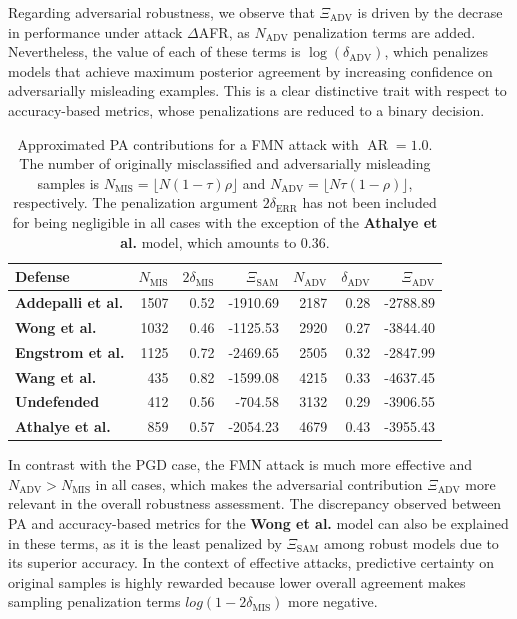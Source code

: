 Regarding adversarial robustness, we observe that $\Xi_{\text{ADV}}$ is driven by the decrase in 
performance under attack $\Delta$AFR, as $N_{\text{ADV}}$ penalization terms
are added. Nevertheless, the value of each of these terms is $\log(\delta_{\text{ADV}})$, which penalizes
models that achieve maximum posterior agreement by increasing confidence on adversarially
misleading examples. This is a clear distinctive trait with respect to accuracy-based metrics,
whose penalizations are reduced to a binary decision.


\begin{table}[H]
    \centering
    \begin{tabular}{l|rrr|rrr}
    Defense & $N_{\text{MIS}}$ & $2 \delta_{\text{MIS}}$ & $\Xi_{\text{SAM}}$ & $N_{\text{ADV}}$ & $\delta_{\text{ADV}}$ & $\Xi_{\text{ADV}}$ \\
    \midrule
    {\color{tab:purple} \textbf{Addepalli et al.}} & 1507 & 0.52 & -1910.69 & 2187 & 0.28 & -2788.89 \\
    {\color{tab:red} \textbf{Wong et al.}} & 1032 & 0.46 & -1125.53 & 2920 & 0.27 & -3844.40 \\
    {\color{tab:blue} \textbf{Engstrom et al.}} & 1125 & 0.72 & -2469.65 & 2505 & 0.32 & -2847.99 \\
    {\color{tab:brown} \textbf{Wang et al.}} & 435 & 0.82 & -1599.08 & 4215 & 0.33 & -4637.45 \\
    {\color{tab:orange} \textbf{Undefended}} & 412 & 0.56 & -704.58 & 3132 & 0.29 & -3906.55 \\
    {\color{tab:green} \textbf{Athalye et al.}} & 859 & 0.57 & -2054.23 & 4679 & 0.43 & -3955.43 \\
    \bottomrule
    \end{tabular}
    \caption{
    Approximated PA contributions for a FMN attack with $\operatorname{AR} = 1.0$. The number of 
    originally misclassified and adversarially misleading
    samples is $N_{\text{MIS}} = \lfloor N (1-\tau) \rho \rfloor$ and
    $N_{\text{ADV}} = \lfloor N \tau (1-\rho) \rfloor$, respectively. 
    The penalization argument $2 \delta_{\text{ERR}}$ has not
    been included for being negligible in all cases with the exception of the 
    {\color{tab:green} \textbf{Athalye et al.}} model, which amounts to 0.36. 
    }
    \label{tab:approx_pa_fmn_table}
    \end{table}

In contrast with the PGD case, the FMN attack is much more effective and $N_{\text{ADV}} > N_{\text{MIS}}$
in all cases, which makes the adversarial contribution $\Xi_{\text{ADV}}$ more relevant in the
overall robustness assessment. The discrepancy observed between PA and
accuracy-based metrics for the {\color{tab:red} \textbf{Wong et al.}} model can also be explained 
in these terms, as it is the least penalized by $\Xi_{\text{SAM}}$ among robust models due to its
superior accuracy. In the context of effective attacks, predictive certainty on
original samples is highly rewarded because lower overall agreement makes sampling penalization terms
$log(1 - 2 \delta_{\text{MIS}})$ more negative. \\

